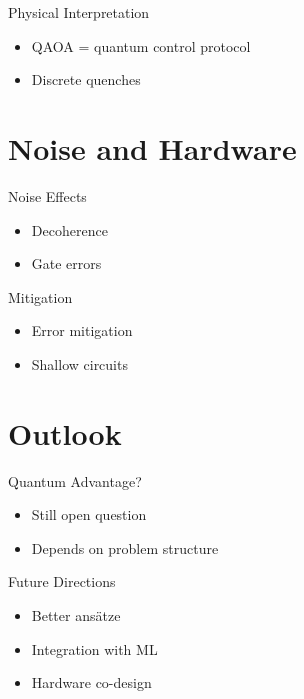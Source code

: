 \documentclass{beamer}
\begin{document}

\begin{frame}{Physical Interpretation}
\begin{itemize}
\item QAOA = quantum control protocol
\item Discrete quenches
\end{itemize}
\end{frame}

\section{Noise and Hardware}

\begin{frame}{Noise Effects}
\begin{itemize}
\item Decoherence
\item Gate errors
\end{itemize}
\end{frame}


\begin{frame}{Mitigation}
\begin{itemize}
\item Error mitigation
\item Shallow circuits
\end{itemize}
\end{frame}

\section{Outlook}

\begin{frame}{Quantum Advantage?}
\begin{itemize}
\item Still open question
\item Depends on problem structure
\end{itemize}
\end{frame}


\begin{frame}{Future Directions}
\begin{itemize}
\item Better ansätze
\item Integration with ML
\item Hardware co-design
\end{itemize}
\end{frame}
\end{document}
